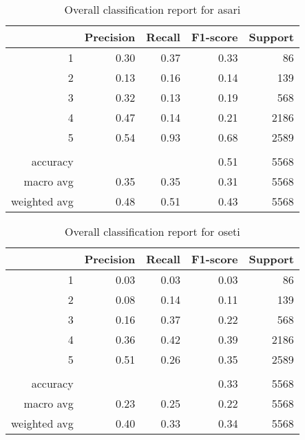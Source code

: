 \documentclass[12pt]{article}
\begin{document}
	\begin{table}
		\begin{center}
			{\renewcommand{\arraystretch}{1.5}
				\renewcommand{\tabcolsep}{0.2cm}
				\begin{tabular}{r r r r r}
					& Precision & Recall & F1-score & Support\\
					\hline
					1 & 0.30 & 0.37 & 0.33 & 86\\
					2 & 0.13 & 0.16 & 0.14 & 139\\
					3 & 0.32 & 0.13 & 0.19 & 568\\
					4 & 0.47 & 0.14 & 0.21 & 2186\\
					5 & 0.54 & 0.93 & 0.68 & 2589\\
					& & & & \\
					accuracy & & & 0.51 & 5568\\
					macro avg & 0.35 & 0.35 & 0.31 & 5568\\
					weighted avg & 0.48 & 0.51 & 0.43 & 5568
			\end{tabular}}
		\end{center}
		\caption{Overall classification report for asari}
	\end{table}
	
	\begin{table}
		\begin{center}
			{\renewcommand{\arraystretch}{1.5}
				\renewcommand{\tabcolsep}{0.2cm}
				\begin{tabular}{r r r r r}
					& Precision & Recall & F1-score & Support\\
					\hline
					1 & 0.03 & 0.03 & 0.03 & 86\\
					2 & 0.08 & 0.14 & 0.11 & 139\\
					3 & 0.16 & 0.37 & 0.22 & 568\\
					4 & 0.36 & 0.42 & 0.39 & 2186\\
					5 & 0.51 & 0.26 & 0.35 & 2589\\
					& & & & \\
					accuracy & & & 0.33 & 5568\\
					macro avg & 0.23 & 0.25 & 0.22 & 5568\\
					weighted avg & 0.40 & 0.33 & 0.34 & 5568
			\end{tabular}}
		\end{center}
		\caption{Overall classification report for oseti}
	\end{table}
	
\end{document}
